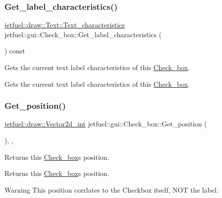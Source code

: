 \subsubsection{\texorpdfstring{Get\+\_\+label\+\_\+characteristics()}{Get\_label\_characteristics()}}
{\footnotesize\ttfamily \hyperlink{structjetfuel_1_1draw_1_1Text_1_1Text__characteristics}{jetfuel\+::draw\+::\+Text\+::\+Text\+\_\+characteristics} jetfuel\+::gui\+::\+Check\+\_\+box\+::\+Get\+\_\+label\+\_\+characteristics (\begin{DoxyParamCaption}{ }\end{DoxyParamCaption}) const\hspace{0.3cm}{\ttfamily [inline]}}



Gets the current text label characteristics of this \hyperlink{classjetfuel_1_1gui_1_1Check__box}{Check\+\_\+box}. 

Gets the current text label characteristics of this \hyperlink{classjetfuel_1_1gui_1_1Check__box}{Check\+\_\+box}. \mbox{\label{classjetfuel_1_1gui_1_1Check__box_a7f14e8be560d0be5a05839442de1f18f}} 
\subsubsection{\texorpdfstring{Get\+\_\+position()}{Get\_position()}}
{\footnotesize\ttfamily \hyperlink{classjetfuel_1_1draw_1_1Vector2d}{jetfuel\+::draw\+::\+Vector2d\+\_\+int} jetfuel\+::gui\+::\+Check\+\_\+box\+::\+Get\+\_\+position (\begin{DoxyParamCaption}{ }\end{DoxyParamCaption})\hspace{0.3cm}{\ttfamily [inline]}, {\ttfamily [override]}, {\ttfamily [virtual]}}



Returns this \hyperlink{classjetfuel_1_1gui_1_1Check__box}{Check\+\_\+box}\textquotesingle{}s position. 

Returns this \hyperlink{classjetfuel_1_1gui_1_1Check__box}{Check\+\_\+box}\textquotesingle{}s position.

\begin{DoxyWarning}{Warning}
This position corrlates to the Checkbox itself, N\+OT the label. 
\end{DoxyWarning}


